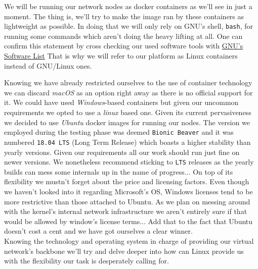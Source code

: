                 We will be running our network nodes as docker containers as we'll see in just a moment. The thing is, we'll try to make the image ran by these containers as lightweight as possible. In doing that we will only rely on GNU's shell, \texttt{bash}, for running some commands which aren't doing the heavy lifting at all. One can confirm this statement by cross checking our used software tools with \href{https://www.gnu.org/software/software.html}{GNU's Software List} That is why we will refer to our platform as Linux containers instead of GNU/Linux ones.

            Knowing we have already restricted ourselves to the use of container technology we can discard \textit{macOS} as an option right away as there is no official support for it. We could have used \textit{Windows}-based containers but given our uncommon requirements we opted to use a \textit{linux} based one. Given its current pervasiveness we decided to use \textit{Ubuntu} docker images for running our nodes. The version we employed during the testing phase was deemed \texttt{Bionic Beaver} and it was numbered \texttt{18.04 LTS} (Long Term Release) which boasts a higher stability than yearly versions. Given our requirements all our work should run just fine on newer versions. We nonetheless recommend sticking to \texttt{LTS} releases as the yearly builds can mess some internals up in the name of progress... On top of its flexibility we mustn't forget about the price and licensing factors. Even though we haven't looked into it regarding Microsoft's OS, Windows licenses tend to be more restrictive than those attached to Ubuntu. As we plan on messing around with the kernel's internal network infrastructure we aren't entirely sure if that would be allowed by window's license terms... Add that to the fact that Ubuntu doesn't cost a cent and we have got ourselves a clear winner.\\

            Knowing the technology and operating system in charge of providing our virtual network's backbone we'll try and delve deeper into how can Linux provide us with the flexibility our task is desperately calling for.
